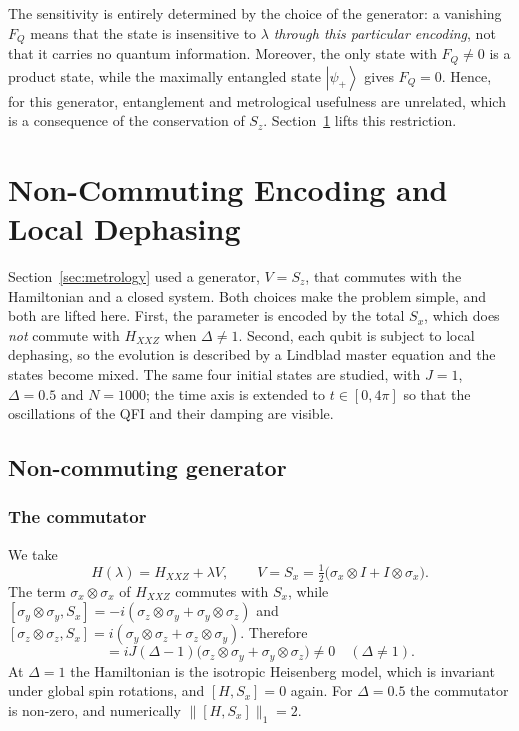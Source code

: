 \documentclass[11pt,a4paper]{article}
\newcommand{\ket}[1]{\left|#1\right\rangle}
\newcommand{\FQ}{F_Q}
\begin{document}
The sensitivity is entirely determined by the choice of the generator: a vanishing $\FQ$ means that the state is insensitive to $\lambda$ \emph{through this particular encoding}, not that it carries no quantum information. Moreover, the only state with $\FQ\neq0$ is a product state, while the maximally entangled state $\ket{\psi_+}$ gives $\FQ=0$. Hence, for this generator, entanglement and metrological usefulness are unrelated, which is a consequence of the conservation of $S_z$. Section~\ref{sec:noncomm} lifts this restriction.

\section{Non-Commuting Encoding and Local Dephasing}\label{sec:noncomm}

Section~\ref{sec:metrology} used a generator, $V=S_z$, that commutes with the Hamiltonian and a closed system. Both choices make the problem simple, and both are lifted here. First, the parameter is encoded by the total $S_x$, which does \emph{not} commute with $H_{XXZ}$ when $\Delta\neq1$. Second, each qubit is subject to local dephasing, so the evolution is described by a Lindblad master equation and the states become mixed. The same four initial states are studied, with $J=1$, $\Delta=0.5$ and $N=1000$; the time axis is extended to $t\in[0,4\pi]$ so that the oscillations of the QFI and their damping are visible.

\subsection{Non-commuting generator}

\subsubsection{The commutator}
We take
\begin{equation}
  H(\lambda)=H_{XXZ}+\lambda V,\qquad V=S_x=\tfrac12\bigl(\sigma_x\otimes I+I\otimes\sigma_x\bigr).
\end{equation}
The term $\sigma_x\otimes\sigma_x$ of $H_{XXZ}$ commutes with $S_x$, while
$[\sigma_y\otimes\sigma_y,S_x]=-i(\sigma_z\otimes\sigma_y+\sigma_y\otimes\sigma_z)$ and
$[\sigma_z\otimes\sigma_z,S_x]=i(\sigma_y\otimes\sigma_z+\sigma_z\otimes\sigma_y)$. Therefore
\begin{equation}
  [H_{XXZ},S_x]=iJ(\Delta-1)\bigl(\sigma_z\otimes\sigma_y+\sigma_y\otimes\sigma_z\bigr)\neq0\quad(\Delta\neq1).
  \label{eq:comm-Sx}
\end{equation}
At $\Delta=1$ the Hamiltonian is the isotropic Heisenberg model, which is invariant under global spin rotations, and $[H,S_x]=0$ again. For $\Delta=0.5$ the commutator is non-zero, and numerically $\lVert[H,S_x]\rVert_1=2$.
\end{document}
